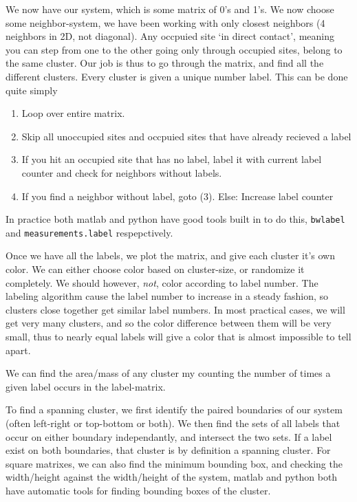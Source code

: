 \documentclass[a4paper, 11pt, notitlepage, english]{article}
\begin{document}
We now have our system, which is some matrix of 0's and 1's. We now choose some neighbor-system, we have been working with only closest neighbors (4 neighbors in 2D, not diagonal). Any occpuied site `in direct contact', meaning you can step from one to the other going only through occupied sites, belong to the same cluster. Our job is thus to go through the matrix, and find all the different clusters. Every cluster is given a unique number label. This can be done quite simply
\begin{enumerate}
	\item Loop over entire matrix. 
	\item Skip all unoccupied sites and occpuied sites that have already recieved a label
	\item If you hit an occupied site that has no label, label it with current label counter and check for neighbors without labels.
	\item If you find a neighbor without label, goto (3). Else: Increase label counter
\end{enumerate}
In practice both matlab and python have good tools built in to do this, \verb+bwlabel+ and \verb+measurements.label+ respepctively.

Once we have all the labels, we plot the matrix, and give each cluster it's own color. We can either choose color based on cluster-size, or randomize it completely. We should however, \emph{not}, color according to label number. The labeling algorithm cause the label number to increase in a steady fashion, so clusters close together get similar label numbers. In most practical cases, we will get very many clusters, and so the color difference between them will be very small, thus to nearly equal labels will give a color that is almost impossible to tell apart.

We can find the area/mass of any cluster my counting the number of times a given label occurs in the label-matrix.

To find a spanning cluster, we first identify the paired boundaries of our system (often left-right or top-bottom or both). We then find the sets of all labels that occur on either boundary independantly, and intersect the two sets. If a label exist on both boundaries, that cluster is by definition a spanning cluster. For square matrixes, we can also find the minimum bounding box, and checking the width/height against the width/height of the system, matlab and python both have automatic tools for finding bounding boxes of the cluster.
\end{document}
